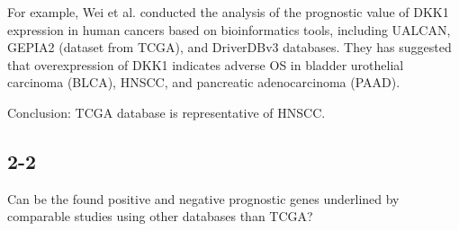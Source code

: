 \documentclass[preprint,12pt]{elsarticle}
\newenvironment{MyColorPar}[1]{%
    \leavevmode\color{#1}\ignorespaces%
}{%
}%
\begin{document}
\begin{MyColorPar}{blue}
For example, Wei et al.\cite{Wei2020} conducted the analysis of the prognostic value of DKK1 expression in human cancers based on bioinformatics tools, including UALCAN, GEPIA2 (dataset from TCGA)\cite{Tang2019}, and DriverDBv3 databases.
They has suggested that overexpression of DKK1 indicates adverse OS in bladder urothelial carcinoma (BLCA)\cite{Wei2020}, HNSCC\cite{Chakraborty2020}\cite{Hu2020}\cite{Wei2020}, and pancreatic adenocarcinoma (PAAD)\cite{Wei2020}. %


Conclusion: TCGA database is representative of HNSCC.

\end{MyColorPar}

\subsection*{2-2}
Can be the found positive and negative prognostic genes underlined by comparable studies using other databases than TCGA?
\end{document}
